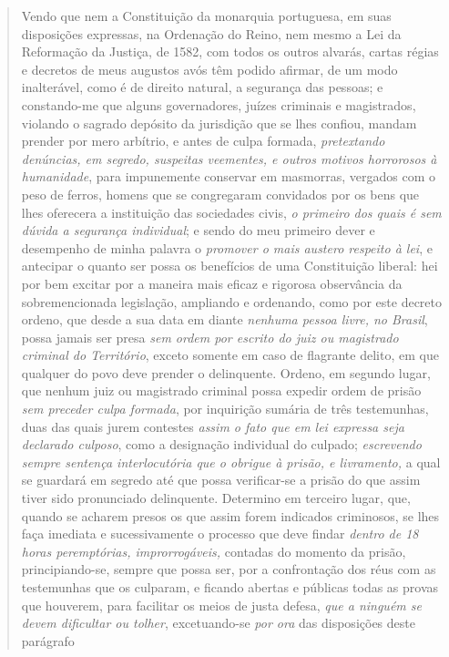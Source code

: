 {\begin{quote}
Vendo que nem a Constituição da monarquia portuguesa, em suas
disposições expressas, na Ordenação do Reino, nem mesmo a Lei da
Reformação da Justiça, de 1582, com todos os outros alvarás, cartas
régias e decretos de meus augustos avós têm podido afirmar, de um modo
inalterável, como é de direito natural, a segurança das pessoas; e
constando-me que alguns governadores, juízes criminais e magistrados,
violando o sagrado depósito da jurisdição que se lhes confiou, mandam
prender por mero arbítrio, e antes de culpa formada, \emph{pretextando
denúncias, em segredo, suspeitas veementes, e outros motivos horrorosos
à humanidade}, para impunemente conservar em masmorras, vergados com o
peso de ferros, homens que se congregaram convidados por os bens que
lhes oferecera a instituição das sociedades civis, \emph{o primeiro dos
quais é sem dúvida a segurança individual}; e sendo do meu primeiro
dever e desempenho de minha palavra o \emph{promover o mais austero
respeito à lei}, e antecipar o quanto ser possa os benefícios de uma
Constituição liberal: hei por bem excitar por a maneira mais eficaz e
rigorosa observância da sobremencionada legislação, ampliando e
ordenando, como por este decreto ordeno, que desde a sua data em diante
\emph{nenhuma pessoa livre, no Brasil}, possa jamais ser presa \emph{sem
ordem por escrito do juiz ou magistrado criminal do Território}, exceto
somente em caso de flagrante delito, em que qualquer do povo deve
prender o delinquente. Ordeno, em segundo lugar, que nenhum juiz ou
magistrado criminal possa expedir ordem de prisão \emph{sem preceder
culpa formada}, por inquirição sumária de três testemunhas, duas das
quais jurem contestes \emph{assim o fato que em lei expressa seja
declarado culposo}, como a designação individual do culpado;
\emph{escrevendo sempre sentença interlocutória que o obrigue à prisão,
e livramento,} a qual se guardará em segredo até que possa verificar-se
a prisão do que assim tiver sido pronunciado delinquente. Determino em
terceiro lugar, que, quando se acharem presos os que assim forem
indicados criminosos, se lhes faça imediata e sucessivamente o processo
que deve findar \emph{dentro de 18 horas peremptórias, improrrogáveis,}
contadas do momento da prisão, principiando-se, sempre que possa ser,
por a confrontação dos réus com as testemunhas que os culparam, e
ficando abertas e públicas todas as provas que houverem, para facilitar
os meios de justa defesa, \emph{que a ninguém se devem dificultar ou
tolher}, excetuando-se \emph{por ora} das disposições deste parágrafo

\end{quote}}
